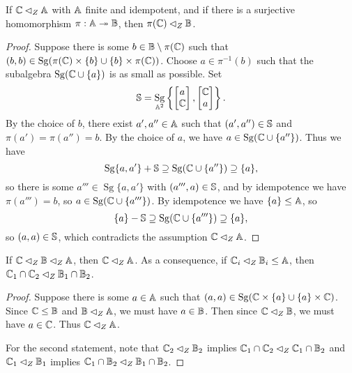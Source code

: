 \documentclass[letterpaper,11pt]{article}
\DeclareMathOperator{\Sg}{Sg}
\begin{document}
\begin{prop} If $\mathbb{C} \lhd_Z \mathbb{A}$ with $\mathbb{A}$ finite and idempotent, and if there is a surjective homomorphism $\pi : \mathbb{A} \twoheadrightarrow \mathbb{B}$, then $\pi(\mathbb{C}) \lhd_Z \mathbb{B}$.
\end{prop}
\begin{proof} Suppose there is some $b \in \mathbb{B}\setminus\pi(\mathbb{C})$ such that $(b,b) \in \Sg(\pi(\bC)\times \{b\} \cup \{b\} \times \pi(\bC))$. Choose $a \in \pi^{-1}(b)$ such that the subalgebra $\Sg(\bC\cup \{a\})$ is as small as possible. Set
\[
\bS = \Sg_{\bA^2}\left\{\begin{bmatrix}a\\ \bC\end{bmatrix}, \begin{bmatrix} \bC \\ a\end{bmatrix}\right\}.
\]
By the choice of $b$, there exist $a',a'' \in \mathbb{A}$ such that $(a',a'') \in \mathbb{S}$ and $\pi(a') = \pi(a'') = b$. By the choice of $a$, we have $a \in \Sg(\bC \cup \{a''\})$. Thus we have
\[
\Sg\{a,a'\} + \bS \supseteq \Sg(\bC \cup \{a''\}) \supseteq \{a\},
\]
so there is some $a''' \in \Sg\{a,a'\}$ with $(a''',a) \in \mathbb{S}$, and by idempotence we have $\pi(a''') = b$, so $a \in \Sg(\bC \cup \{a'''\})$. By idempotence we have $\{a\} \le \mathbb{A}$, so
\[
\{a\} - \bS \supseteq \Sg(\bC \cup \{a'''\}) \supseteq \{a\},
\]
so $(a,a) \in \mathbb{S}$, which contradicts the assumption $\mathbb{C} \lhd_Z \mathbb{A}$.
\end{proof}

\begin{comment}
\begin{prop} If $\bC_1, \bC_2 \lhd_Z \bA$, then $\bC_1 \cap \bC_2 \lhd_Z \bA$. More generally, if $\bC_i \lhd_Z \bB_i \le \bA$, then $\bC_1 \cap \bC_2 \lhd_Z \bB_1 \cap \bB_2$. Similarly, if $\bC \lhd_Z \bB \lhd_Z \bA$, then $\bC \lhd_Z \bA$.
\end{prop}
\begin{proof} Consider the first statement, and let $\bC = \bC_1 \cap \bC_2$. Suppose there is some $a \in \bA$ such that $(a,a) \in \Sg(\bC\times \{a\} \cup \{a\}\times \bC)$. Then since $\bC_1 \lhd_Z \bA$ and $\bC \le \bC_1$, we must have $a \in \bC_1$, and similarly $a \in \bC_2$. The other statements are proved almost exactly the same way.
\end{proof}
\end{comment}

\begin{prop} If $\mathbb{C} \lhd_Z \mathbb{B} \lhd_Z \mathbb{A}$, then $\mathbb{C} \lhd_Z \mathbb{A}$. As a consequence, if $\mathbb{C}_i \lhd_Z \mathbb{B}_i \le \mathbb{A}$, then $\mathbb{C}_1 \cap \mathbb{C}_2 \lhd_Z \mathbb{B}_1 \cap \mathbb{B}_2$.
\end{prop}
\begin{proof} Suppose there is some $a \in \mathbb{A}$ such that $(a,a) \in \Sg(\bC\times \{a\} \cup \{a\}\times \bC)$. Since $\mathbb{C} \le \mathbb{B}$ and $\mathbb{B} \lhd_Z \mathbb{A}$, we must have $a \in \mathbb{B}$. Then since $\mathbb{C} \lhd_Z \mathbb{B}$, we must have $a \in \mathbb{C}$. Thus $\mathbb{C} \lhd_Z \mathbb{A}$.

For the second statement, note that $\mathbb{C}_2 \lhd_Z \mathbb{B}_2$ implies $\mathbb{C}_1 \cap \mathbb{C}_2 \lhd_Z \mathbb{C}_1 \cap \mathbb{B}_2$ and $\mathbb{C}_1 \lhd_Z \mathbb{B}_1$ implies $\mathbb{C}_1\cap \mathbb{B}_2 \lhd_Z \mathbb{B}_1\cap\mathbb{B}_2$.
\end{proof}
\end{document}
